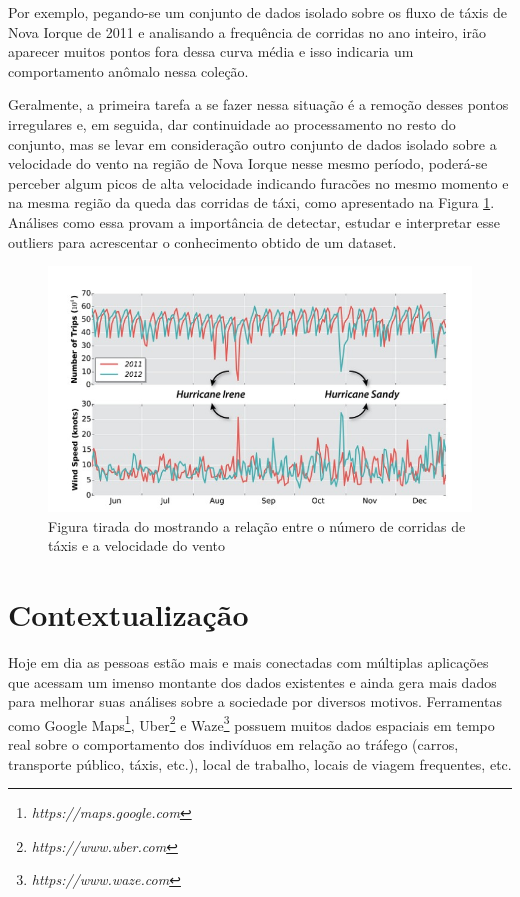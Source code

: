 Por exemplo, pegando-se um conjunto de dados isolado sobre os fluxo de táxis de Nova Iorque de 2011 e analisando a frequência de corridas no ano inteiro, irão aparecer muitos pontos fora dessa curva média e isso indicaria um comportamento anômalo nessa coleção.

Geralmente, a primeira tarefa a se fazer nessa situação é a remoção desses pontos irregulares e, em seguida, dar continuidade ao processamento no resto do conjunto, mas se levar em consideração outro conjunto de dados isolado sobre a velocidade do vento na região de Nova Iorque nesse mesmo período, poderá-se perceber algum picos de alta velocidade indicando furacões no mesmo momento e na mesma região da queda das corridas de táxi, como apresentado na Figura \ref{fig:freire-paper-taxi-wind}. Análises como essa provam a importância de detectar, estudar e interpretar esse outliers para acrescentar o conhecimento obtido de um dataset.

\begin{figure}[t]
	\centering
	\includegraphics[width=\textwidth]{images/outlier-freire-figure-1}
	\caption{Figura tirada do \cite{DBLP:journals/debu/FreireCVZ16} mostrando a relação entre o número de corridas de táxis e a velocidade do vento}
	\label{fig:freire-paper-taxi-wind}
	\vspace{-10pt}
\end{figure}

\section{Contextualização}

Hoje em dia as pessoas estão mais e mais conectadas com múltiplas aplicações que acessam um imenso montante dos dados existentes e ainda gera mais dados para melhorar suas análises sobre a sociedade por diversos motivos. Ferramentas como Google Maps\footnote{\it https://maps.google.com}, Uber\footnote{\it https://www.uber.com} e Waze\footnote{\it https://www.waze.com} possuem muitos dados espaciais em tempo real sobre o comportamento dos indivíduos em relação ao tráfego (carros, transporte público, táxis, etc.), local de trabalho, locais de viagem frequentes, etc.

